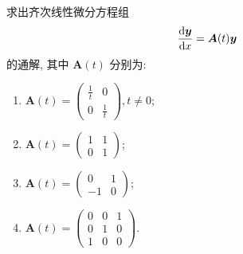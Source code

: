 \begin{exercise}
  求出齐次线性微分方程组
  \[\frac{\mathop{}\!\mathrm{d}\bm{y}}{\mathop{}\!\mathrm{d} x}=\bm{A}(t)\bm{y}\]
  的通解, 其中 $\bm{A}(t)$ 分别为:
  \begin{enumerate}[(1)]
  \item $\displaystyle\bm{A}(t)=\begin{pmatrix}\frac{1}{t}&0\\0&\frac{1}{t}\end{pmatrix},t\neq0$;
  \item $\displaystyle\bm{A}(t)=\begin{pmatrix}1&1\\0&1\end{pmatrix}$;
  \item $\displaystyle\bm{A}(t)=\begin{pmatrix}0&1\\-1&0\end{pmatrix}$;
  \item $\displaystyle\bm{A}(t)=\begin{pmatrix}0&0&1\\0&1&0\\1&0&0\end{pmatrix}$.
  \end{enumerate}
\end{exercise}

